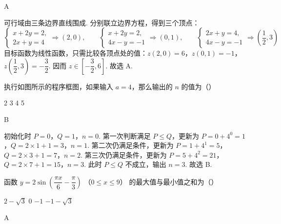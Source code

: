 \begin{answer}
A
\end{answer}

\begin{solution}
可行域由三条边界直线围成. 分别联立边界方程，得到三个顶点：
\[
\begin{cases}
x+2y=2,\\
2x+y=4
\end{cases}
\Rightarrow(2,0),\qquad
\begin{cases}
x+2y=2,\\
4x-y=-1
\end{cases}
\Rightarrow(0,1),\qquad
\begin{cases}
2x+y=4,\\
4x-y=-1
\end{cases}
\Rightarrow\left(\dfrac12,3\right)
\]
目标函数为线性函数，只需比较各顶点处的值：\(z(2,0)=6\)，\(z(0,1)=-1\)，\(z\left(\dfrac12,3\right)=-\dfrac32\). 因而 \(z\in\left[-\dfrac32,6\right]\). 故选 A.
\end{solution}

\begin{problem}
执行如图所示的程序框图，如果输入 \(a=4\)，那么输出的 \(n\) 的值为（\quad）


\choices
    {2}
    {3}
    {4}
    {5}
\end{problem}

\begin{answer}
B
\end{answer}

\begin{solution}
初始化时 \(P=0\)，\(Q=1\)，\(n=0\). 第一次判断满足 \(P\leqslant Q\)，更新为 \(P=0+4^0=1\)，\(Q=2\times1+1=3\)，\(n=1\). 第二次仍满足条件，更新为 \(P=1+4^1=5\)，\(Q=2\times3+1=7\)，\(n=2\). 第三次仍满足条件，更新为 \(P=5+4^2=21\)，\(Q=2\times7+1=15\)，\(n=3\). 此时 \(P\leqslant Q\) 不成立，输出 \(n=3\). 故选 B.
\end{solution}

\begin{problem}
函数 \(y=2\sin\left(\dfrac{\pi x}{6}-\dfrac{\pi}{3}\right)\) （\(0\leqslant x\leqslant9\)） 的最大值与最小值之和为（\quad）

\choices
    {\(2-\sqrt3\)}
    {0}
    {\(-1\)}
    {\(-1-\sqrt3\)}
\end{problem}

\begin{answer}
A
\end{answer}

